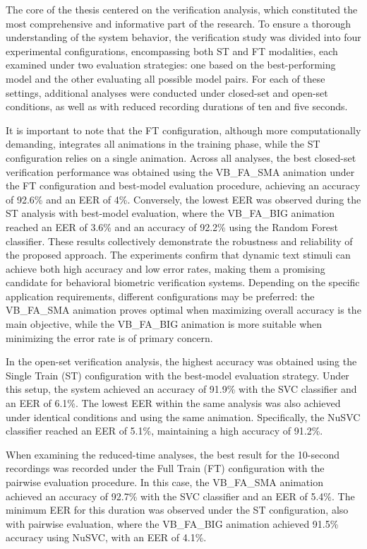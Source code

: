 \documentclass[12pt]{report}
\begin{document}
The core of the thesis centered on the verification analysis, which constituted the most comprehensive and informative part of the research. 
To ensure a thorough understanding of the system behavior, the verification study was divided into four experimental configurations, encompassing both ST and FT modalities, each examined under two evaluation strategies: one based on the best-performing model and the other evaluating all possible model pairs. 
For each of these settings, additional analyses were conducted under closed-set and open-set conditions, as well as with reduced recording durations of ten and five seconds.

It is important to note that the FT configuration, although more computationally demanding, integrates all animations in the training phase, while the ST configuration relies on a single animation. 
Across all analyses, the best closed-set verification performance was obtained using the VB\_FA\_SMA animation under the FT configuration and best-model evaluation procedure, achieving an accuracy of 92.6\% and an EER of 4\%. 
Conversely, the lowest EER was observed during the ST analysis with best-model evaluation, where the VB\_FA\_BIG animation reached an EER of 3.6\% and an accuracy of 92.2\% using the Random Forest classifier.
These results collectively demonstrate the robustness and reliability of the proposed approach. 
The experiments confirm that dynamic text stimuli can achieve both high accuracy and low error rates, making them a promising candidate for behavioral biometric verification systems. 
Depending on the specific application requirements, different configurations may be preferred: the VB\_FA\_SMA animation proves optimal when maximizing overall accuracy is the main objective, while the VB\_FA\_BIG animation is more suitable when minimizing the error rate is of primary concern.

In the open-set verification analysis, the highest accuracy was obtained using the Single Train (ST) configuration with the best-model evaluation strategy. 
Under this setup, the system achieved an accuracy of 91.9\% with the SVC classifier and an EER of 6.1\%. 
The lowest EER within the same analysis was also achieved under identical conditions and using the same animation. 
Specifically, the NuSVC classifier reached an EER of 5.1\%, maintaining a high accuracy of 91.2\%.

When examining the reduced-time analyses, the best result for the 10-second recordings was recorded under the Full Train (FT) configuration with the pairwise evaluation procedure. 
In this case, the VB\_FA\_SMA animation achieved an accuracy of 92.7\% with the SVC classifier and an EER of 5.4\%. 
The minimum EER for this duration was observed under the ST configuration, also with pairwise evaluation, where the VB\_FA\_BIG animation achieved 91.5\% accuracy using NuSVC, with an EER of 4.1\%.
\end{document}
